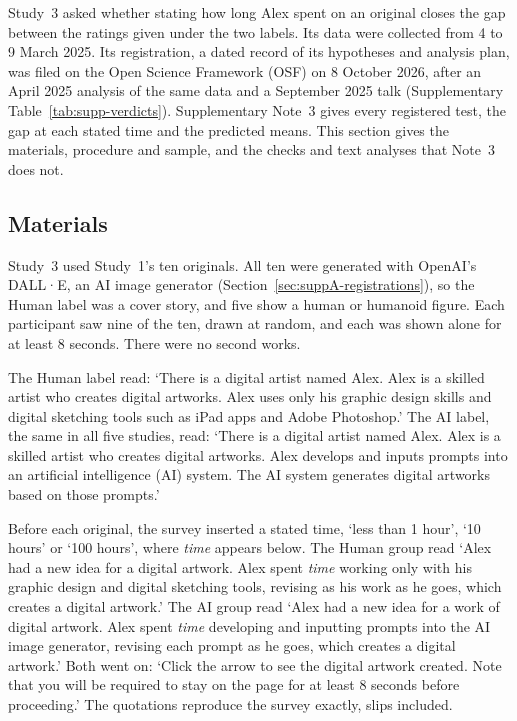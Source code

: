 \label{sec:suppB-study3}

Study~3 asked whether stating how long Alex spent on an original closes the gap between the ratings given under the two labels. Its data were collected from 4 to 9 March 2025. Its registration, a dated record of its hypotheses and analysis plan, was filed on the Open Science Framework (OSF) on 8 October 2026, after an April 2025 analysis of the same data and a September 2025 talk (Supplementary Table~\ref{tab:supp-verdicts}). Supplementary Note~3 gives every registered test, the gap at each stated time and the predicted means. This section gives the materials, procedure and sample, and the checks and text analyses that Note~3 does not.

\subsection*{Materials}

Study~3 used Study~1's ten originals. All ten were generated with OpenAI's DALL·E, an AI image generator (Section~\ref{sec:suppA-registrations}), so the Human label was a cover story, and five show a human or humanoid figure. Each participant saw nine of the ten, drawn at random, and each was shown alone for at least 8 seconds. There were no second works.

The Human label read: `There is a digital artist named Alex. Alex is a skilled artist who creates digital artworks. Alex uses only his graphic design skills and digital sketching tools such as iPad apps and Adobe Photoshop.' The AI label, the same in all five studies, read: `There is a digital artist named Alex. Alex is a skilled artist who creates digital artworks. Alex develops and inputs prompts into an artificial intelligence (AI) system. The AI system generates digital artworks based on those prompts.'

Before each original, the survey inserted a stated time, `less than 1 hour', `10 hours' or `100 hours', where \textit{time} appears below. The Human group read `Alex had a new idea for a digital artwork. Alex spent \textit{time} working only with his graphic design and digital sketching tools, revising as his work as he goes, which creates a digital artwork.' The AI group read `Alex had a new idea for a work of digital artwork. Alex spent \textit{time} developing and inputting prompts into the AI image generator, revising each prompt as he goes, which creates a digital artwork.' Both went on: `Click the arrow to see the digital artwork created. Note that you will be required to stay on the page for at least 8 seconds before proceeding.' The quotations reproduce the survey exactly, slips included.

